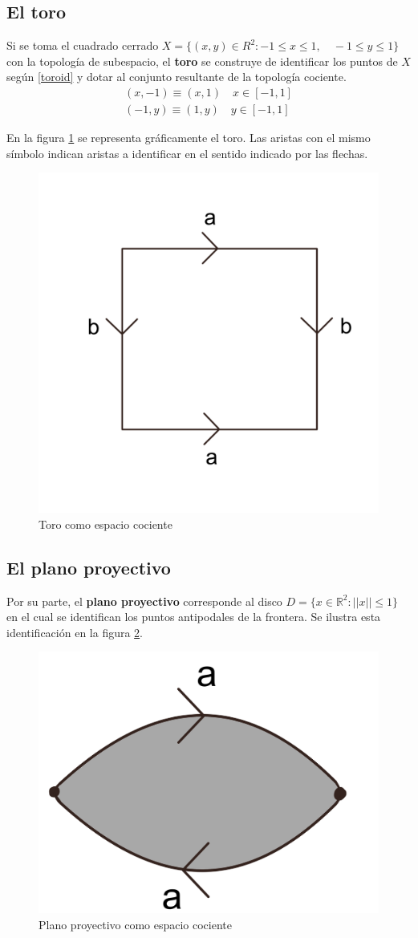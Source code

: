 \documentclass[a4paper,11pt,spanish, twoside, leqno]{tfg-uam}
\theoremstyle{definition}
\begin{document}
\subsection*{El toro}
Si se toma el cuadrado cerrado $ X = \{ (x,y) \in R^2: -1\leq x\leq 1,\quad -1\leq y \leq 1  \} $ con la topología de subespacio, el \textbf{toro}  se construye de identificar los puntos de  $ X $ según  \ref{toroid} y dotar al conjunto resultante de la topología cociente.
\begin{align}\label{toroid}
	(x,-1)\equiv(x,1) \quad x\in [-1,1]  \\
	(-1,y)\equiv(1,y) \quad y\in [-1,1] \nonumber
\end{align}

En la figura \ref{fig:toro expresion canonica} se representa gráficamente el toro. Las aristas con el mismo símbolo indican aristas a identificar en el sentido indicado por las flechas.

\begin{figure}[h!]
	\centering
	\includegraphics[width=0.3\linewidth]{imagenes/toroplano.png}
	\caption{Toro como espacio cociente}
	\label{fig:toro expresion canonica}
\end{figure} 


\subsection*{El plano proyectivo}
Por su parte, el \textbf{plano proyectivo} corresponde al disco $ D = \{x\in\mathbb{R}^2: ||x||\leq1 \} $ en el cual se identifican los puntos antipodales de la frontera. Se ilustra esta identificación en la figura \ref{fig:planoproyectivo expresión canónica}.

\begin{figure}[h!]
	\centering
	\includegraphics[width=0.3\linewidth]{imagenes/planop_plano.png}
	\caption{Plano proyectivo como espacio cociente}
	\label{fig:planoproyectivo expresión canónica}
\end{figure} 
\end{document}
